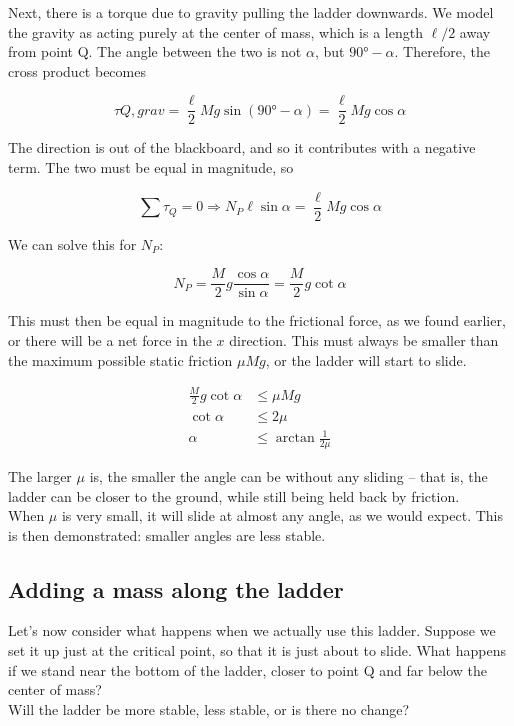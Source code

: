 Next, there is a torque due to gravity pulling the ladder downwards. We model the gravity as acting purely at the center of mass, which is a length $\ell/2$ away from point Q. The angle between the two is not $\alpha$, but $\ang{90} - \alpha$. Therefore, the cross product becomes

\begin{equation}
\tau{Q,grav} = \frac{\ell}{2} M g \sin(\ang{90} - \alpha) = \frac{\ell}{2} M g \cos \alpha
\end{equation}

The direction is out of the blackboard, and so it contributes with a negative term. The two must be equal in magnitude, so

\begin{equation}
\sum \tau_Q = 0 \Rightarrow N_P \ell \sin \alpha = \frac{\ell}{2} M g \cos \alpha
\end{equation}

We can solve this for $N_P$:

\begin{equation}
N_P = \frac{M}{2} g \frac{\cos \alpha}{\sin \alpha} = \frac{M}{2} g \cot \alpha
\end{equation}

This must then be equal in magnitude to the frictional force, as we found earlier, or there will be a net force in the $x$ direction. This must always be smaller than the maximum possible static friction $\mu M g$, or the ladder will start to slide.

\begin{align}
\frac{M}{2} g \cot \alpha &\le \mu M g\\
\cot \alpha &\le 2 \mu\\
\alpha &\le \arctan \frac{1}{2 \mu}
\end{align}

The larger $\mu$ is, the smaller the angle can be without any sliding -- that is, the ladder can be closer to the ground, while still being held back by friction.\\
When $\mu$ is very small, it will slide at almost any angle, as we would expect. This is then demonstrated: smaller angles are less stable.

\subsection{Adding a mass along the ladder}

Let's now consider what happens when we actually use this ladder. Suppose we set it up just at the critical point, so that it is just about to slide. What happens if we stand near the bottom of the ladder, closer to point Q and far below the center of mass?\\
Will the ladder be more stable, less stable, or is there no change?


